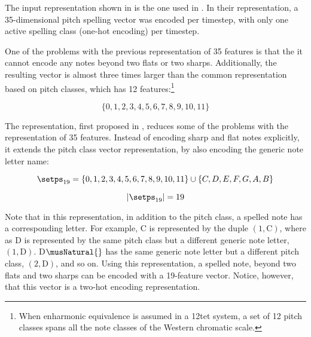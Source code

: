 The input representation shown in 
is the one used in \textcite{micchi2020not, micchi2021deep}.
In their representation, a 35-dimensional pitch spelling
vector was encoded per timestep, with only one active
spelling class (one-hot encoding) per timestep.


One of the problems with the previous representation of 35
features is that the it cannot encode any notes beyond two
flats or two sharps. Additionally, the resulting vector is
almost three times larger than the common representation
based on pitch classes, which has 12 features:\footnote{When
enharmonic equivalence is assumed in a \gls{12tet} system, a
set of 12 pitch classes spans all the note classes of the
Western chromatic scale.}

\begin{equation}
    \{0, 1, 2, 3, 4, 5, 6, 7, 8, 9, 10, 11\}
\end{equation}

The representation, first proposed in
\textcite{napoleslopez2021augmentednet}, reduces some of the
problems with the representation of 35 features. Instead of
encoding \gls{sharp} and \gls{flat} notes explicitly, it
extends the pitch class vector representation, by also
encoding the generic note letter name:

\begin{equation}
    \label{eq:pitch_spelling_19}
    \setps_{19} = \{0, 1, 2, 3, 4, 5, 6, 7, 8, 9, 10, 11\} 
    \cup \{C, D, E, F, G, A, B\}
\end{equation}


\begin{equation}
    \label{eq:pitch_spelling_19_magnitude}
    | \setps_{19} | = 19
\end{equation}

Note that in this representation, in addition to the pitch
class, a spelled note has a corresponding letter. For
example, C\musSharp{} is represented by the duple $(1,
\text{C})$, where as D\musFlat{} is represented by the same
pitch class but a different generic note letter, $(1,
\text{D})$. D$\musNatural{}$ has the same generic note
letter but a different pitch class, $(2, \text{D})$, and so
on. Using this representation, a spelled note, beyond two
flats and two sharps can be encoded with a 19-feature
vector. Notice, however, that this vector is a two-hot
encoding representation.
